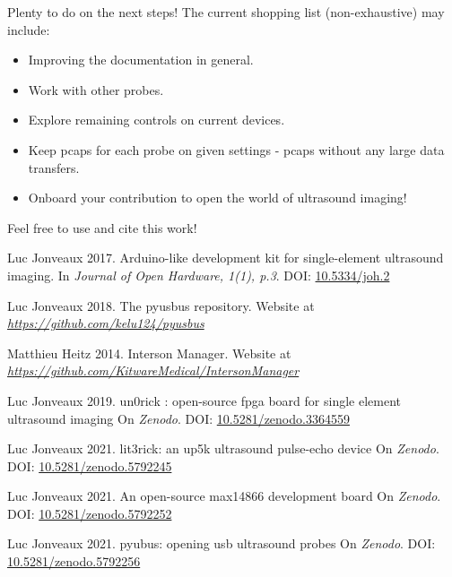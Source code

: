 \documentclass{article}
\begin{document}
Plenty to do on the next steps! The current shopping list (non-exhaustive) may include:

\begin{itemize}
\item Improving the documentation in general.
\item Work with other probes.
\item Explore remaining controls on current devices. 
\item Keep pcaps for each probe on given settings - pcaps without any large data transfers.
\item Onboard your contribution to open the world of ultrasound imaging!
\end{itemize}

Feel free to use and cite this work!


%                        
                         
  
\begin{thebibliography}{1}

Luc Jonveaux 2017.
\newblock  Arduino-like development kit for single-element ultrasound imaging. 
\newblock In {\em  Journal of Open Hardware, 1(1), p.3}. DOI: \href{http://doi.org/10.5334/joh.2}{10.5334/joh.2}

Luc Jonveaux 2018.
\newblock The pyusbus repository.
\newblock Website at {\em\href{https://github.com/kelu124/pyusbus}{https://github.com/kelu124/pyusbus}}

Matthieu Heitz 2014.
\newblock Interson Manager.
\newblock Website at {\em\href{https://github.com/KitwareMedical/IntersonManager}{https://github.com/KitwareMedical/IntersonManager}}

Luc Jonveaux 2019.
\newblock  un0rick : open-source fpga board for single element ultrasound imaging
\newblock On {\em  Zenodo}. DOI: \href{http://doi.org/10.5281/zenodo.3364559}{10.5281/zenodo.3364559}

Luc Jonveaux 2021.
\newblock lit3rick: an up5k ultrasound pulse-echo device %
\newblock On {\em  Zenodo}. DOI: \href{http://doi.org/10.5281/zenodo.5792245}{10.5281/zenodo.5792245}

Luc Jonveaux 2021.
\newblock An open-source max14866 development board %
\newblock On {\em  Zenodo}. DOI: \href{http://doi.org/10.5281/zenodo.5792252}{10.5281/zenodo.5792252}

Luc Jonveaux 2021.
\newblock  pyubus: opening usb ultrasound probes  %
\newblock On {\em  Zenodo}. DOI: \href{http://doi.org/10.5281/zenodo.5792256}{10.5281/zenodo.5792256}

\end{thebibliography}
\end{document}
